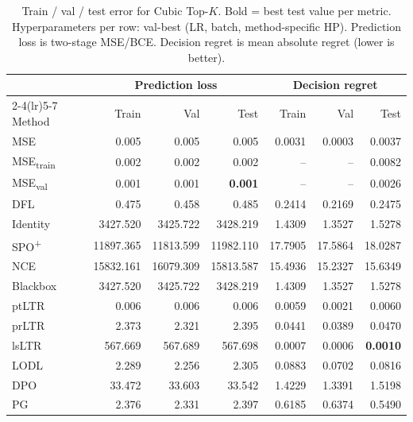 \begin{table}[t]
\centering
\caption{Train / val / test error for Cubic Top-$K$. Bold = best test value per metric. Hyperparameters per row: val-best (LR, batch, method-specific HP). Prediction loss is two-stage MSE/BCE. Decision regret is mean absolute regret (lower is better).}
\label{tab:err-cubic}
\setlength{\tabcolsep}{4pt}
\renewcommand{\arraystretch}{1.05}
\begin{tabular}{@{}lrrrrrr@{}}
\toprule
& \multicolumn{3}{c}{Prediction loss} & \multicolumn{3}{c}{Decision regret} \\
\cmidrule(lr){2-4}\cmidrule(lr){5-7}
Method & Train & Val & Test & Train & Val & Test \\
\midrule
MSE & 0.005 & 0.005 & 0.005 & 0.0031 & 0.0003 & 0.0037 \\
MSE\textsubscript{train} & 0.002 & 0.002 & 0.002 & -- & -- & 0.0082 \\
MSE\textsubscript{val} & 0.001 & 0.001 & \textbf{0.001} & -- & -- & 0.0026 \\
DFL & 0.475 & 0.458 & 0.485 & 0.2414 & 0.2169 & 0.2475 \\
Identity & 3427.520 & 3425.722 & 3428.219 & 1.4309 & 1.3527 & 1.5278 \\
SPO\textsuperscript{+} & 11897.365 & 11813.599 & 11982.110 & 17.7905 & 17.5864 & 18.0287 \\
NCE & 15832.161 & 16079.309 & 15813.587 & 15.4936 & 15.2327 & 15.6349 \\
Blackbox & 3427.520 & 3425.722 & 3428.219 & 1.4309 & 1.3527 & 1.5278 \\
ptLTR & 0.006 & 0.006 & 0.006 & 0.0059 & 0.0021 & 0.0060 \\
prLTR & 2.373 & 2.321 & 2.395 & 0.0441 & 0.0389 & 0.0470 \\
lsLTR & 567.669 & 567.689 & 567.698 & 0.0007 & 0.0006 & \textbf{0.0010} \\
LODL & 2.289 & 2.256 & 2.305 & 0.0883 & 0.0702 & 0.0816 \\
DPO & 33.472 & 33.603 & 33.542 & 1.4229 & 1.3391 & 1.5198 \\
PG & 2.376 & 2.331 & 2.397 & 0.6185 & 0.6374 & 0.5490 \\
\bottomrule
\end{tabular}
\end{table}

